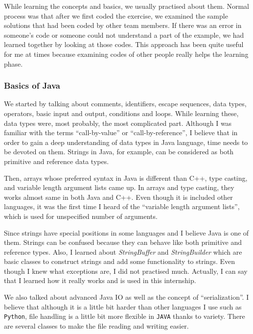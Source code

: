 While learning the concepts and basics, we usually practised about them. Normal process was that after we first coded the exercise, we examined the sample solutions that had been coded by other team members. If there was an error in someone's code or someone could not understand a part of the example, we had learned together by looking at those codes. This approach has been quite useful for me at times because examining codes of other people really helps the learning phase.

\subsubsection{Basics of Java}

We started by talking about comments, identifiers, escape sequences, data types, operators, basic input and output, conditions and loops. While learning these, data types were, most probably, the most complicated part. Although I was familiar with the terms ``call-by-value'' or ``call-by-reference'', I believe that in order to gain a deep understanding of data types in Java language, time needs to be devoted on them. Strings in Java, for example, can be considered as both primitive and reference data types.

Then, arrays whose preferred syntax in Java is different than C++, type casting, and variable length argument lists came up. In arrays and type casting, they works almost same in both Java and C++. Even though it is included other languages, it was the first time I heard of the ``variable length argument lists'', which is used for unspecified number of arguments. 

Since strings have special positions in some languages and I believe Java is one of them. Strings can be confused because they can behave like both primitive and reference types. Also, I learned about \textit{StringBuffer} and \textit{StringBuilder} which are basic classes to construct strings and add some functionality to strings. Even though I knew what exceptions are, I did not practised much. Actually, I can say that I learned how it really works and is used in this internship.

We also talked about advanced Java IO as well as the concept of ``serialization''. I believe that although it is a little bit harder than other languages I use such as \texttt{Python}, file handling is a little bit more flexible in \texttt{JAVA} thanks to variety. There are several classes to make the file reading and writing easier.

